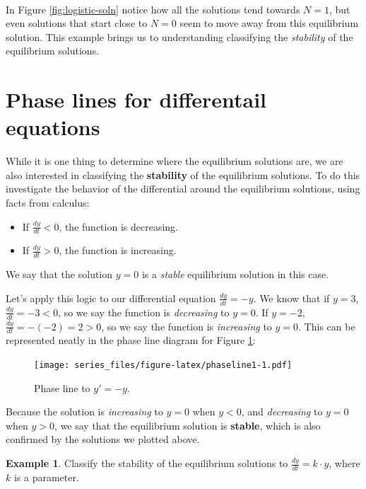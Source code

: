 \documentclass[
]{book}
\providecommand{\tightlist}{%
  \setlength{\itemsep}{0pt}\setlength{\parskip}{0pt}}
\theoremstyle{definition}
\theoremstyle{definition}
\newtheorem{example}{Example}[chapter]
\theoremstyle{definition}
\theoremstyle{remark}
\begin{document}
~

In Figure \ref{fig:logistic-soln} notice how all the solutions tend towards \(N=1\), but even solutions that start close to \(N=0\) seem to move away from this equilibrium solution. This example brings us to understanding classifying the \emph{stability} of the equilibrium solutions.

\hypertarget{phase-lines-for-differentail-equations}{%
\section{Phase lines for differentail equations}\label{phase-lines-for-differentail-equations}}

While it is one thing to determine where the equilibrium solutions are, we are also interested in classifying the \textbf{stability} of the equilibrium solutions. To do this investigate the behavior of the differential around the equilibrium solutions, using facts from calculus:

\begin{itemize}
\tightlist
\item
  If \(\displaystyle \frac{dy}{dt}<0\), the function is decreasing.
\item
  If \(\displaystyle \frac{dy}{dt}>0\), the function is increasing.
\end{itemize}

We say that the solution \(y=0\) is a \emph{stable} equilibrium solution in this case.

Let's apply this logic to our differential equation \(\displaystyle \frac{dy}{dt}=- y\). We know that if \(y=3\), \(\displaystyle \frac{dy}{dt}=- 3 <0\), so we say the function is \emph{decreasing} to \(y=0\). If \(y=-2\), \(\displaystyle \frac{dy}{dt}=- (-2) = 2 >0\), so we say the function is \emph{increasing} to \(y=0\). This can be represented neatly in the phase line diagram for Figure \ref{fig:phaseline1}:

\begin{figure}
\centering
\texttt{[image: series\_files/figure-latex/phaseline1-1.pdf]}
\caption{\label{fig:phaseline1}Phase line to \(y'=-y\).}
\end{figure}

Because the solution is \emph{increasing} to \(y=0\) when \(y <0\), and \emph{decreasing} to \(y=0\) when \(y >0\), we say that the equilibrium solution is \textbf{stable}, which is also confirmed by the solutions we plotted above.

\begin{example}
\protect\hypertarget{exm:general-exponential}{}{\label{exm:general-exponential} }Classify the stability of the equilibrium solutions to \(\displaystyle \frac{dy}{dt} = k \cdot y\), where \(k\) is a parameter.
\end{example}
\end{document}
